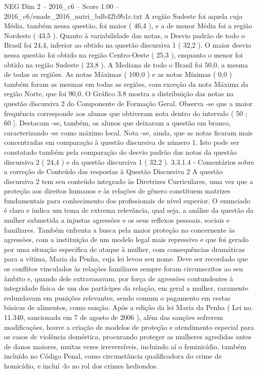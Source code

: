 \begin{textsample}{NEG Dim 2 – 2016\_c6 – Score 1.00 – 2016\_c6/enade\_2016\_nutri\_bdb42b9b1c.txt}
A região Sudeste foi aquela cuja Média, também nessa questão, foi maior ( 46,4 ), e a de menor Média foi a região Nordeste ( 43,5 ).
Quanto à variabilidade das notas, o Desvio padrão de todo o Brasil foi 24,4, inferior ao obtido na questão discursiva 1 ( 32,2 ).
O maior desvio nessa questão foi obtido na região Centro-Oeste ( 25,3 ), enquanto o menor foi obtido na região Sudeste ( 23,8 ).
A Mediana de todo o Brasil foi 50,0, a mesma de todas as regiões.
As notas Máximas ( 100,0 ) e as notas Mínimas ( 0,0 ) também foram as mesmas em todas as regiões, com exceção da nota Máxima da região Norte, que foi 90,0.
O Gráfico 3.8 mostra a distribuição das notas na questão discursiva 2 do Componente de Formação Geral.
Observa -se que a maior frequência corresponde aos alunos que obtiveram nota dentro do intervalo ( 50 ; 60 ].
Destacam -se, também, os alunos que deixaram a questão em branco, caracterizando -se como máximo local.
Nota -se, ainda, que as notas ficaram mais concentradas em comparação à questão discursiva de número 1.
Isto pode ser constatado também pela comparação do desvio padrão das notas da questão discursiva 2 ( 24,4 ) e da questão discursiva 1 ( 32,2 ). 3.3.1.4 - Comentários sobre a correção de Conteúdo das respostas à Questão Discursiva 2 A questão discursiva 2 tem seu conteúdo integrado às Diretrizes Curriculares, uma vez que a proteção aos direitos humanos e às relações de gênero constituem matrizes fundamentais para conhecimento dos profissionais de nível superior.
O enunciado é claro e indica um tema de extrema relevância, qual seja, a análise da questão da mulher submetida a injustas agressões e os seus reflexos pessoais, sociais e familiares.
Também enfrenta a busca pela maior proteção no concernente às agressões, com a instituição de um modelo legal mais repressivo e que foi gerado por uma situação especifica de ataque à mulher, com consequências dramáticas para a vítima, Maria da Penha, cuja lei levou seu nome.
Deve ser recordado que os conflitos vinculados às relações familiares sempre foram circunscritos ao seu âmbito e, quando dele extravasavam, por força de agressões contundentes à integridade física de um dos partícipes da relação, em geral a mulher, raramente redundavam em punições relevantes, sendo comum o pagamento em cestas básicas de alimentos, como sanção.
Após a edição da lei Maria da Penha ( Lei no. 11.340, sancionada em 7 de agosto de 2006 ), além das sanções sofrerem modificações, houve a criação de modelos de proteção e atendimento especial para os casos de violência doméstica, procurando proteger as mulheres agredidas antes de danos maiores, muitas vezes irreversíveis, incluindo aí o feminicídio, também incluído no Código Penal, como circunstância qualificadora do crime de homicídio, e incluí -lo no rol dos crimes hediondos.

\end{textsample}
